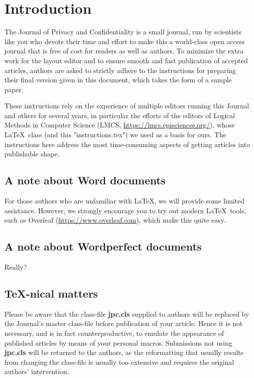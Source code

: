 \documentclass{jpc} %
\theoremstyle{plain}\newtheorem{satz}[thm]{Satz} %
\begin{document}
\maketitle

\section*{Introduction}\label{S:one}

  The Journal of Privacy and Confidentiality is a small journal, run
  by scientists like you who devote their time and effort to make this
  a world-class open access journal that is free of cost for readers
  as well as authors.  To minimize the extra work for the layout
  editor and to ensure smooth and fast publication of accepted
  articles, authors are asked to strictly adhere to the instructions
  for preparing their final version given in this document, which
  takes the form of a sample paper.

  These instructions rely on the experience of multiple editors running this
  Journal and others for several years, in particular the efforts of the editors of Logical Methods in Computer Science (LMCS, \url{https://lmcs.episciences.org/}), whose \LaTeX\  class (and this "instructions.tex") we used as a basis for ours.  The instructions here address the most time-consuming
  aspects of getting articles into publishable shape. 
  
\subsection*{A note about Word documents}
For those authors who are unfamiliar with \LaTeX, we will provide some limited assistance. However, we strongly encourage you to try out modern \LaTeX\  tools, such as Overleaf (\url{https://www.overleaf.com}), which make this quite easy. 


\subsection*{A note about Wordperfect documents}
Really?

\subsection*{\TeX-nical matters}

  Please be aware that the class-file {\bf jpc.cls} supplied to 
  authors will be replaced by the Journal's master class-file before
  publication of your article.  Hence it is not necessary, and is in
  fact counterproductive, to emulate the appearance of published
  articles by means of your personal macros.  Submissions not using
  {\bf jpc.cls} will be returned to the authors, as the reformatting
  that usually results from changing the class-file is usually too
  extensive and requires the original authors' intervention.
\end{document}
